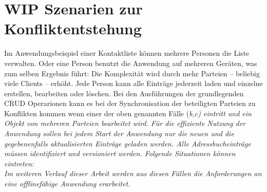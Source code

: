 \section{\label{sec:konfliktszenarien}WIP Szenarien zur Konfliktentstehung}
Im Anwendungsbeispiel einer Kontaktliste können mehrere Personen die Liste verwalten. Oder eine Person benutzt die Anwendung auf mehreren Geräten, was zum selben Ergebnis führt:
Die Komplexität wird durch mehr Parteien -- beliebig viele Clients -- erhöht.
Jede Person kann alle Einträge jederzeit laden und einzelne erstellen, bearbeiten oder löschen. Bei den Ausführungen der grundlegenden \gls{CRUD} Operarionen kann es bei der Synchronisation der beteiligten Parteien zu Konflikten kommen wenn einer der oben genannten Fälle (\it{b,c}) eintritt und ein Objekt von mehreren Parteien bearbeitet wird.
Für die effiziente Nutzung der Anwendung sollen bei jedem Start der Anwendung nur die neuen und die gegebenenfalls aktualisierten Einträge geladen werden. Alle Adressbucheinträge müssen identifiziert und versioniert werden. Folgende Situationen können eintreten:
%
\\
%
Im weiteren Verlauf dieser Arbeit werden aus diesen Fällen die Anforderungen an eine offlinefähige Anwendung erarbeitet.